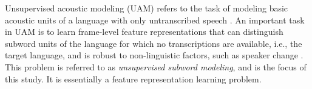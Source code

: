 \documentclass[a4paper]{article}
\begin{document}
Unsupervised acoustic modeling (UAM) refers to the task of modeling basic acoustic units of a language with only untranscribed speech \cite{chen2015parallel,heck2017feature,Kamper2017segmental,Tjandra2019,Feng2019combining,Ondel2019Bayesian}. %
An important task in UAM is to learn frame-level feature representations that can distinguish subword units of the language for which no transcriptions are available, i.e., the target language, and is 
robust to non-linguistic factors, such as speaker change \cite{versteegh2015zero,dunbar2017zero}. This problem is referred to as \textit{unsupervised subword modeling}, and is the focus of this study. It is essentially a feature representation learning problem.

\end{document}
